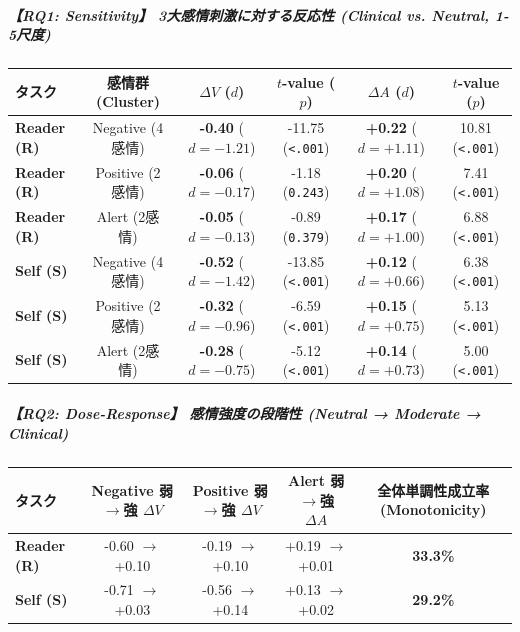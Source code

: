 \subparagraph{【RQ1: Sensitivity】 3大感情刺激に対する反応性 (Clinical vs. Neutral, 1-5尺度)}
\begin{center}
\small
\begin{tabular}{lccccc}
\toprule
\textbf{タスク} & \textbf{感情群 (Cluster)} & \textbf{$\Delta V$ ($d$)} & \textbf{$t$-value ($p$)} & \textbf{$\Delta A$ ($d$)} & \textbf{$t$-value ($p$)} \\
\midrule
\textbf{Reader (R)} & Negative (4感情) & \textbf{-0.40} ($d=-1.21$) & -11.75 (\texttt{<.001}) & \textbf{+0.22} ($d=+1.11$) & 10.81 (\texttt{<.001}) \\
\textbf{Reader (R)} & Positive (2感情) & \textbf{-0.06} ($d=-0.17$) & -1.18 (\texttt{0.243}) & \textbf{+0.20} ($d=+1.08$) & 7.41 (\texttt{<.001}) \\
\textbf{Reader (R)} & Alert (2感情) & \textbf{-0.05} ($d=-0.13$) & -0.89 (\texttt{0.379}) & \textbf{+0.17} ($d=+1.00$) & 6.88 (\texttt{<.001}) \\
\textbf{Self (S)} & Negative (4感情) & \textbf{-0.52} ($d=-1.42$) & -13.85 (\texttt{<.001}) & \textbf{+0.12} ($d=+0.66$) & 6.38 (\texttt{<.001}) \\
\textbf{Self (S)} & Positive (2感情) & \textbf{-0.32} ($d=-0.96$) & -6.59 (\texttt{<.001}) & \textbf{+0.15} ($d=+0.75$) & 5.13 (\texttt{<.001}) \\
\textbf{Self (S)} & Alert (2感情) & \textbf{-0.28} ($d=-0.75$) & -5.12 (\texttt{<.001}) & \textbf{+0.14} ($d=+0.73$) & 5.00 (\texttt{<.001}) \\
\bottomrule
\end{tabular}
\end{center}


\subparagraph{【RQ2: Dose-Response】 感情強度の段階性 (Neutral → Moderate → Clinical)}
\begin{center}
\small
\begin{tabular}{lcccc}
\toprule
\textbf{タスク} & \textbf{Negative 弱$\rightarrow$強 $\Delta V$} & \textbf{Positive 弱$\rightarrow$強 $\Delta V$} & \textbf{Alert 弱$\rightarrow$強 $\Delta A$} & \textbf{全体単調性成立率 (Monotonicity)} \\
\midrule
\textbf{Reader (R)} & -0.60 $\rightarrow$ +0.10 & -0.19 $\rightarrow$ +0.10 & +0.19 $\rightarrow$ +0.01 & \textbf{33.3\%} \\
\textbf{Self (S)} & -0.71 $\rightarrow$ +0.03 & -0.56 $\rightarrow$ +0.14 & +0.13 $\rightarrow$ +0.02 & \textbf{29.2\%} \\
\bottomrule
\end{tabular}
\end{center}


